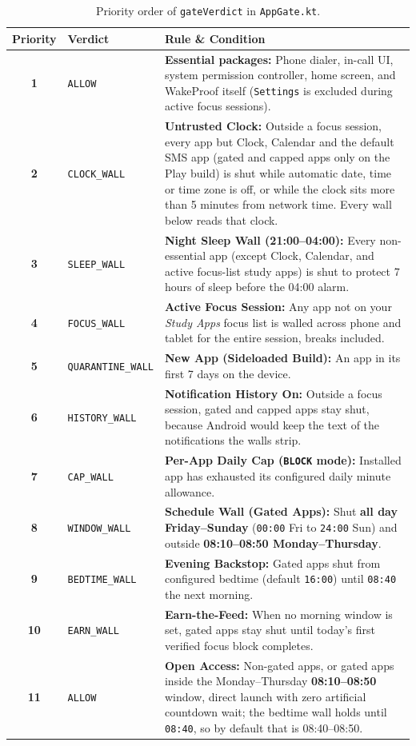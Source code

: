 \documentclass[11pt,a4paper]{article}
\begin{document}
\begin{table}[ht!]
\centering
\small
\begin{tabularx}{\textwidth}{@{}c L{3.4cm} Y@{}}
\toprule
\textbf{\sffamily Priority} & \textbf{\sffamily Verdict} & \textbf{\sffamily Rule \& Condition} \\
\midrule
\textbf{1} & \texttt{ALLOW} & \textbf{Essential packages:} Phone dialer, in-call UI, system permission controller, home screen, and WakeProof itself (\texttt{Settings} is excluded during active focus sessions). \\
\textbf{2} & \texttt{CLOCK\_WALL} & \textbf{Untrusted Clock:} Outside a focus session, every app but Clock, Calendar and the default SMS app (gated and capped apps only on the Play build) is shut while automatic date, time or time zone is off, or while the clock sits more than 5 minutes from network time. Every wall below reads that clock. \\
\textbf{3} & \texttt{SLEEP\_WALL} & \textbf{Night Sleep Wall (21:00--04:00):} Every non-essential app (except Clock, Calendar, and active focus-list study apps) is shut to protect 7 hours of sleep before the 04:00 alarm. \\
\textbf{4} & \texttt{FOCUS\_WALL} & \textbf{Active Focus Session:} Any app not on your \emph{Study Apps} focus list is walled across phone and tablet for the entire session, breaks included. \\
\textbf{5} & \texttt{QUARANTINE\_WALL} & \textbf{New App (Sideloaded Build):} An app in its first 7 days on the device. \\
\textbf{6} & \texttt{HISTORY\_WALL} & \textbf{Notification History On:} Outside a focus session, gated and capped apps stay shut, because Android would keep the text of the notifications the walls strip. \\
\textbf{7} & \texttt{CAP\_WALL} & \textbf{Per-App Daily Cap (\texttt{BLOCK} mode):} Installed app has exhausted its configured daily minute allowance. \\
\textbf{8} & \texttt{WINDOW\_WALL} & \textbf{Schedule Wall (Gated Apps):} Shut \textbf{all day Friday--Sunday} (\texttt{00:00} Fri to \texttt{24:00} Sun) and outside \textbf{08:10--08:50 Monday--Thursday}. \\
\textbf{9} & \texttt{BEDTIME\_WALL} & \textbf{Evening Backstop:} Gated apps shut from configured bedtime (default \texttt{16:00}) until \texttt{08:40} the next morning. \\
\textbf{10} & \texttt{EARN\_WALL} & \textbf{Earn-the-Feed:} When no morning window is set, gated apps stay shut until today's first verified focus block completes. \\
\textbf{11} & \texttt{ALLOW} & \textbf{Open Access:} Non-gated apps, or gated apps inside the Monday--Thursday \textbf{08:10--08:50} window, direct launch with zero artificial countdown wait; the bedtime wall holds until \texttt{08:40}, so by default that is 08:40--08:50. \\
\bottomrule
\end{tabularx}
\caption{Priority order of \texttt{gateVerdict} in \texttt{AppGate.kt}.}
\end{table}
\end{document}
